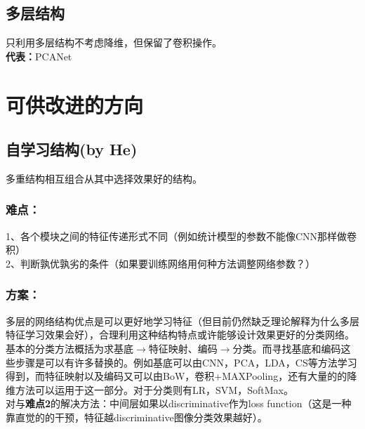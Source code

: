 \documentclass{article}
\begin{document}
\begin{CJK}{UTF8}{gbsn}
\subsection{多层结构}
只利用多层结构不考虑降维，但保留了卷积操作。\\
\textbf{代表：}PCANet\cite{chan2014pcanet}
\section{可供改进的方向}
\subsection{自学习结构(by He)}
多重结构相互组合从其中选择效果好的结构。\\
\subsubsection{难点：}
1、各个模块之间的特征传递形式不同（例如统计模型的参数不能像CNN那样做卷积）\\
2、判断孰优孰劣的条件（如果要训练网络用何种方法调整网络参数？）\\
\subsubsection{方案：}
多层的网络结构优点是可以更好地学习特征（但目前仍然缺乏理论解释为什么多层特征学习效果会好），合理利用这种结构特点或许能够设计效果更好的分类网络。\\
基本的分类方法概括为求基底$\rightarrow$特征映射、编码$\rightarrow$分类。而寻找基底和编码这些步骤是可以有许多替换的。例如基底可以由CNN，PCA，LDA，CS等方法学习得到，而特征映射以及编码又可以由BoW，卷积+MAXPooling，还有大量的的降维方法可以运用于这一部分。对于分类则有LR，SVM，SoftMax。\\
对与\textbf{难点2}的解决方法：中间层如果以discriminative作为loss function（这是一种靠直觉的的干预，特征越discriminative图像分类效果越好）。\\

\end{CJK}
\end{document}

